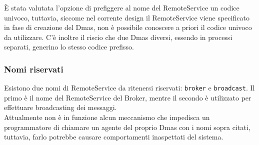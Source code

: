 È stata valutata l'opzione di prefiggere al nome del RemoteService un codice univoco, tuttavia, siccome nel corrente design il RemoteService viene specificato in fase di creazione
del Dmas, non è possibile conoscere a priori il codice univoco da utilizzare. C'è inoltre il riscio che due Dmas diversi, essendo in processi separati, generino lo stesso codice
prefisso.\\

\subsubsection{Nomi riservati}
Esistono due nomi di RemoteService da ritenersi riservati: \texttt{broker} e \texttt{broadcast}. Il primo è il nome del RemoteService del Broker, mentre il secondo è utilizzato 
per effettuare broadcasting dei messaggi.\\

Attualmente non è in funzione alcun meccanismo che impedisca un programmatore di chiamare un agente del proprio Dmas con i nomi sopra citati, tuttavia, farlo potrebbe causare comportamenti
inaspettati del sistema.\\